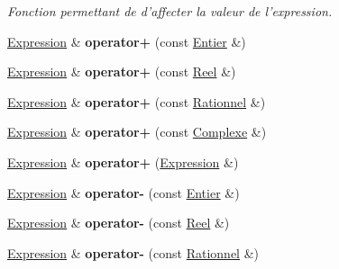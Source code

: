 \begin{DoxyCompactItemize}
\begin{DoxyCompactList}\small\item\em Fonction permettant de d'affecter la valeur de l'expression. \end{DoxyCompactList}\item 
\hypertarget{class_expression_a9059e6564e7737b2b5f22bb101f0e983}{\hyperlink{class_expression}{Expression} \& {\bfseries operator+} (const \hyperlink{class_entier}{Entier} \&)}\label{class_expression_a9059e6564e7737b2b5f22bb101f0e983}

\item 
\hypertarget{class_expression_aea5f4c261ddbc4933a5e33a309e88aae}{\hyperlink{class_expression}{Expression} \& {\bfseries operator+} (const \hyperlink{class_reel}{Reel} \&)}\label{class_expression_aea5f4c261ddbc4933a5e33a309e88aae}

\item 
\hypertarget{class_expression_aab7cfa2f6b1c04012ce6b054b3c7d67e}{\hyperlink{class_expression}{Expression} \& {\bfseries operator+} (const \hyperlink{class_rationnel}{Rationnel} \&)}\label{class_expression_aab7cfa2f6b1c04012ce6b054b3c7d67e}

\item 
\hypertarget{class_expression_a2ad6d5eebc3f72a578af5d42b0708822}{\hyperlink{class_expression}{Expression} \& {\bfseries operator+} (const \hyperlink{class_complexe}{Complexe} \&)}\label{class_expression_a2ad6d5eebc3f72a578af5d42b0708822}

\item 
\hypertarget{class_expression_a0391f7f7e53f8d1428b924ea2e4c54e4}{\hyperlink{class_expression}{Expression} \& {\bfseries operator+} (\hyperlink{class_expression}{Expression} \&)}\label{class_expression_a0391f7f7e53f8d1428b924ea2e4c54e4}

\item 
\hypertarget{class_expression_a35a71e11411774ec1a29ec727295c5c2}{\hyperlink{class_expression}{Expression} \& {\bfseries operator-\/} (const \hyperlink{class_entier}{Entier} \&)}\label{class_expression_a35a71e11411774ec1a29ec727295c5c2}

\item 
\hypertarget{class_expression_a30114836dc371287d679c87cc516d749}{\hyperlink{class_expression}{Expression} \& {\bfseries operator-\/} (const \hyperlink{class_reel}{Reel} \&)}\label{class_expression_a30114836dc371287d679c87cc516d749}

\item 
\hypertarget{class_expression_a8ea0173138b138ae4758e09b062d2e19}{\hyperlink{class_expression}{Expression} \& {\bfseries operator-\/} (const \hyperlink{class_rationnel}{Rationnel} \&)}\label{class_expression_a8ea0173138b138ae4758e09b062d2e19}


\end{DoxyCompactItemize}
